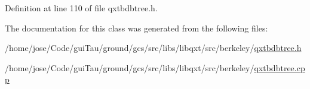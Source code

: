 Definition at line 110 of file qxtbdbtree.\-h.



The documentation for this class was generated from the following files\-:\begin{DoxyCompactItemize}
\item 
/home/jose/\-Code/gui\-Tau/ground/gcs/src/libs/libqxt/src/berkeley/\hyperlink{qxtbdbtree_8h}{qxtbdbtree.\-h}\item 
/home/jose/\-Code/gui\-Tau/ground/gcs/src/libs/libqxt/src/berkeley/\hyperlink{qxtbdbtree_8cpp}{qxtbdbtree.\-cpp}\end{DoxyCompactItemize}
